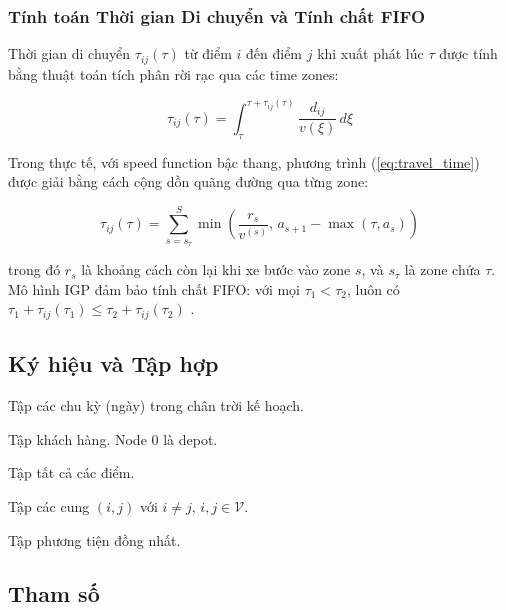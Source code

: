 \documentclass[12pt,a4paper]{article}
\newcommand{\T}{\mathcal{T}}
\newcommand{\N}{\mathcal{N}}
\newcommand{\K}{\mathcal{K}}
\newcommand{\V}{\mathcal{V}}
\newcommand{\A}{\mathcal{A}}
\newcommand{\tij}{\tau_{ij}}
\begin{document}
\subsubsection{Tính toán Thời gian Di chuyển và Tính chất FIFO}

Thời gian di chuyển $\tij(\tau)$ từ điểm $i$ đến điểm $j$ khi xuất phát lúc $\tau$
được tính bằng thuật toán tích phân rời rạc qua các time zones:

\begin{equation}
  \tij(\tau) = \int_{\tau}^{\tau + \tij(\tau)} \frac{d_{ij}}{v(\xi)} \, d\xi
  \label{eq:travel_time}
\end{equation}

\noindent Trong thực tế, với speed function bậc thang, phương trình (\ref{eq:travel_time})
được giải bằng cách cộng dồn quãng đường qua từng zone:

\begin{equation}
  \tij(\tau) = \sum_{s=s_\tau}^{S} \min\!\left(\frac{r_s}{v^{(s)}},\,
                                    a_{s+1} - \max(\tau, a_s)\right)
  \label{eq:tt_discrete}
\end{equation}

\noindent trong đó $r_s$ là khoảng cách còn lại khi xe bước vào zone $s$, và $s_\tau$
là zone chứa $\tau$. Mô hình IGP đảm bảo tính chất FIFO: với mọi $\tau_1 < \tau_2$,
luôn có $\tau_1 + \tij(\tau_1) \leq \tau_2 + \tij(\tau_2)$
\citep{ghiani2014note}.

\subsection{Ký hiệu và Tập hợp}

\begin{description}[leftmargin=3cm, labelwidth=2.5cm, font=\normalfont\bfseries]
  \item[$\T = \{1,\ldots,T\}$] Tập các chu kỳ (ngày) trong chân trời kế hoạch.
  \item[$\N' = \{1,\ldots,n\}$] Tập khách hàng. Node $0$ là depot.
  \item[$\V = \N' \cup \{0\}$] Tập tất cả các điểm.
  \item[$\A$] Tập các cung $(i,j)$ với $i \neq j$, $i,j \in \V$.
  \item[$\K = \{1,\ldots,m\}$] Tập phương tiện đồng nhất.
\end{description}

\subsection{Tham số}
\end{document}
